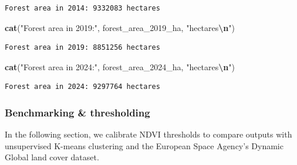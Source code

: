 \documentclass[
]{article}
\newenvironment{Shaded}{\begin{snugshade}}{\end{snugshade}}
\newcommand{\FunctionTok}[1]{\textcolor[rgb]{0.13,0.29,0.53}{\textbf{#1}}}
\newcommand{\NormalTok}[1]{#1}
\newcommand{\SpecialCharTok}[1]{\textcolor[rgb]{0.81,0.36,0.00}{\textbf{#1}}}
\newcommand{\StringTok}[1]{\textcolor[rgb]{0.31,0.60,0.02}{#1}}
\begin{document}
\begin{verbatim}
Forest area in 2014: 9332083 hectares
\end{verbatim}

\begin{Shaded}
\begin{Highlighting}[]
\FunctionTok{cat}\NormalTok{(}\StringTok{"Forest area in 2019:"}\NormalTok{, forest\_area\_2019\_ha, }\StringTok{"hectares}\SpecialCharTok{\textbackslash{}n}\StringTok{"}\NormalTok{)}
\end{Highlighting}
\end{Shaded}

\begin{verbatim}
Forest area in 2019: 8851256 hectares
\end{verbatim}

\begin{Shaded}
\begin{Highlighting}[]
\FunctionTok{cat}\NormalTok{(}\StringTok{"Forest area in 2024:"}\NormalTok{, forest\_area\_2024\_ha, }\StringTok{"hectares}\SpecialCharTok{\textbackslash{}n}\StringTok{"}\NormalTok{)}
\end{Highlighting}
\end{Shaded}

\begin{verbatim}
Forest area in 2024: 9297764 hectares
\end{verbatim}

\subsubsection{Benchmarking \&
thresholding}\label{benchmarking-thresholding}

In the following section, we calibrate NDVI thresholds to compare
outputs with unsupervised K-means clustering and the European Space
Agency's Dynamic Global land cover dataset.
\end{document}
